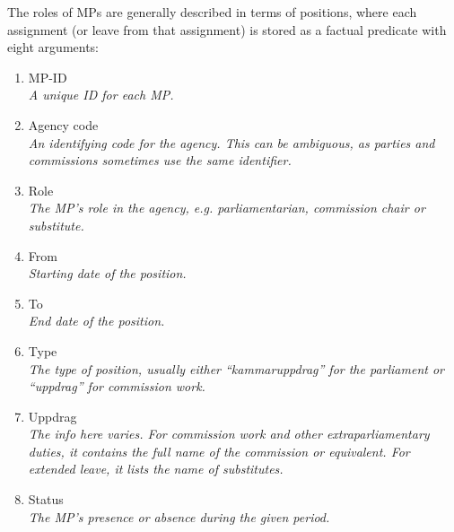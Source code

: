 The roles of MPs are generally described in terms of positions, where each assignment (or leave from that assignment) is stored as a factual predicate with eight arguments:
\begin{enumerate}
    \item MP-ID\\ \emph{A unique ID for each MP.}
    \item Agency code\\ \emph{An identifying code for the agency. This can be ambiguous, as parties and commissions sometimes use the same identifier.}
    \item Role\\ \emph{The MP's role in the agency, e.g. parliamentarian, commission chair or substitute.}
    \item From\\ \emph{Starting date of the position.}
    \item To\\ \emph{End date of the position.}
    \item Type\\ \emph{The type of position, usually either ``kammaruppdrag'' for the parliament or ``uppdrag'' for commission work.}
    \item Uppdrag\\ \emph{The info here varies. For commission work and other extraparliamentary duties, it contains the full name of the commission or equivalent. For extended leave, it lists the name of substitutes.}
    \item Status\\ \emph{The MP's presence or absence during the given period.}
\end{enumerate}

